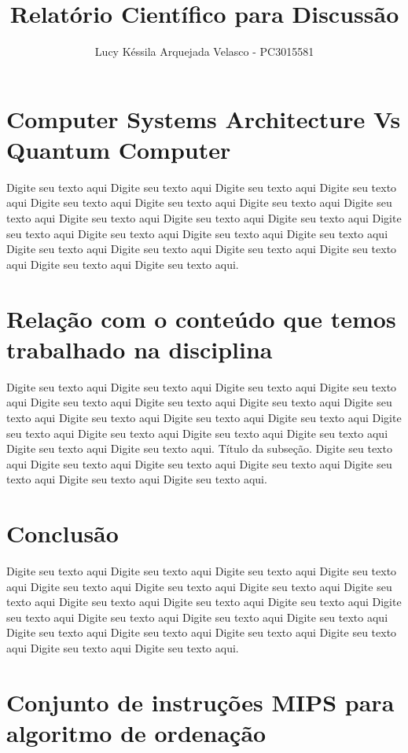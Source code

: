 \documentclass{article}
\title{Relatório Científico para Discussão}
\author{Lucy Késsila Arquejada Velasco - PC3015581}
\numberwithin{figure}{section}
\begin{document}
\maketitle
\section{Computer Systems Architecture Vs Quantum Computer}
Digite seu texto aqui Digite seu texto aqui Digite seu texto aqui Digite seu texto aqui Digite seu texto aqui Digite seu texto aqui Digite seu texto aqui Digite seu texto aqui Digite seu texto aqui Digite seu texto aqui Digite seu texto aqui Digite seu texto aqui Digite seu texto aqui Digite seu texto aqui Digite seu texto aqui Digite seu texto aqui Digite seu texto aqui Digite seu texto aqui Digite seu texto aqui Digite seu texto aqui Digite seu texto aqui.

\section{Relação com o conteúdo que temos trabalhado na disciplina}
Digite seu texto aqui Digite seu texto aqui Digite seu texto aqui Digite seu texto aqui Digite seu texto aqui Digite seu texto aqui Digite seu texto aqui Digite seu texto aqui Digite seu texto aqui Digite seu texto aqui Digite seu texto aqui Digite seu texto aqui Digite seu texto aqui Digite seu texto aqui Digite seu texto aqui Digite seu texto aqui Digite seu texto aqui.
Título da subseção. Digite seu texto aqui Digite seu texto aqui Digite seu texto aqui Digite seu texto aqui Digite seu texto aqui Digite seu texto aqui Digite seu texto aqui.
\section{Conclusão}
Digite seu texto aqui Digite seu texto aqui Digite seu texto aqui Digite seu texto aqui Digite seu texto aqui Digite seu texto aqui Digite seu texto aqui Digite seu texto aqui Digite seu texto aqui Digite seu texto aqui Digite seu texto aqui Digite seu texto aqui Digite seu texto aqui Digite seu texto aqui Digite seu texto aqui Digite seu texto aqui Digite seu texto aqui Digite seu texto aqui Digite seu texto aqui Digite seu texto aqui Digite seu texto aqui.


\section{Conjunto de instruções MIPS para algoritmo de ordenação}
\url{}


\end{document}
